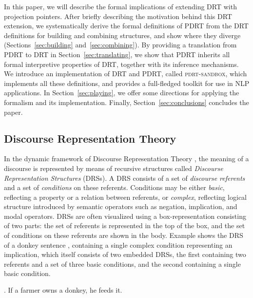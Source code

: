 In this paper, we will describe the formal implications of extending DRT
with projection pointers. After briefly describing the motivation behind
this DRT extension, we systematically derive the formal definitions of PDRT
from the DRT definitions for building and combining structures, and show
where they diverge (Sections~\ref{sec:building} and~\ref{sec:combining}). By
providing a translation from PDRT to DRT in Section~\ref{sec:translating},
we show that PDRT inherits all formal interpretive properties of DRT,
together with its inference mechanisms.  We introduce an implementation of
DRT and PDRT, called \textsc{pdrt-sandbox}, which implements all these
definitions, and provides a full-fledged toolkit for use in NLP
applications. In Section~\ref{sec:playing}, we offer some directions for
applying the formalism and its implementation. Finally,
Section~\ref{sec:conclusions} concludes the paper.

\subsection{Discourse Representation Theory}

In the dynamic framework of Discourse Representation Theory
, the meaning of a discourse is
represented by means of recursive structures called \textit{Discourse
Representation Structures} (DRSs). A DRS consists of a set of
\textit{discourse referents} and a set of \textit{conditions} on these
referents. Conditions may be either \textit{basic}, reflecting a property or
a relation between referents, or \textit{complex}, reflecting logical
structure introduced by semantic operators such as negation, implication,
and modal operators. DRSs are often visualized using a box-representation
consisting of two parts: the set of referents is represented in the top of
the box, and the set of conditions on these referents are shown in the body.
Example \Next shows the DRS of a donkey sentence
, containing a single complex
condition representing an implication, which itself consists of two embedded
DRSs, the first containing two referents and a set of three basic
conditions, and the second containing a single basic condition.

\ex. If a farmer owns a donkey, he feeds it.\label{ex:donkey}\\\hspace*{-0.2cm}

